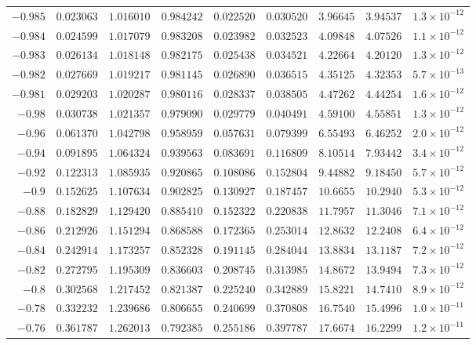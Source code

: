 \documentclass[12pt]{extarticle}
\theoremstyle{plain}
\theoremstyle{remark}
\begin{document}
{\begin{longtable}{rcccccccc}
$-0.985$ & $0.023063$ & $1.016010$ & $0.984242$ & $0.022520$ & $0.030520$ & $3.96645$ & $3.94537$ & $1.3\times10^{-12}$ \\
$-0.984$ & $0.024599$ & $1.017079$ & $0.983208$ & $0.023982$ & $0.032523$ & $4.09848$ & $4.07526$ & $1.1\times10^{-12}$ \\
$-0.983$ & $0.026134$ & $1.018148$ & $0.982175$ & $0.025438$ & $0.034521$ & $4.22664$ & $4.20120$ & $1.3\times10^{-12}$ \\
$-0.982$ & $0.027669$ & $1.019217$ & $0.981145$ & $0.026890$ & $0.036515$ & $4.35125$ & $4.32353$ & $5.7\times10^{-13}$ \\
$-0.981$ & $0.029203$ & $1.020287$ & $0.980116$ & $0.028337$ & $0.038505$ & $4.47262$ & $4.44254$ & $1.6\times10^{-12}$ \\
$-0.98$ & $0.030738$ & $1.021357$ & $0.979090$ & $0.029779$ & $0.040491$ & $4.59100$ & $4.55851$ & $1.3\times10^{-12}$ \\
$-0.96$ & $0.061370$ & $1.042798$ & $0.958959$ & $0.057631$ & $0.079399$ & $6.55493$ & $6.46252$ & $2.0\times10^{-12}$ \\
$-0.94$ & $0.091895$ & $1.064324$ & $0.939563$ & $0.083691$ & $0.116809$ & $8.10514$ & $7.93442$ & $3.4\times10^{-12}$ \\
$-0.92$ & $0.122313$ & $1.085935$ & $0.920865$ & $0.108086$ & $0.152804$ & $9.44882$ & $9.18450$ & $5.7\times10^{-12}$ \\
$-0.9$ & $0.152625$ & $1.107634$ & $0.902825$ & $0.130927$ & $0.187457$ & $10.6655$ & $10.2940$ & $5.3\times10^{-12}$ \\
$-0.88$ & $0.182829$ & $1.129420$ & $0.885410$ & $0.152322$ & $0.220838$ & $11.7957$ & $11.3046$ & $7.1\times10^{-12}$ \\
$-0.86$ & $0.212926$ & $1.151294$ & $0.868588$ & $0.172365$ & $0.253014$ & $12.8632$ & $12.2408$ & $6.4\times10^{-12}$ \\
$-0.84$ & $0.242914$ & $1.173257$ & $0.852328$ & $0.191145$ & $0.284044$ & $13.8834$ & $13.1187$ & $7.2\times10^{-12}$ \\
$-0.82$ & $0.272795$ & $1.195309$ & $0.836603$ & $0.208745$ & $0.313985$ & $14.8672$ & $13.9494$ & $7.3\times10^{-12}$ \\
$-0.8$ & $0.302568$ & $1.217452$ & $0.821387$ & $0.225240$ & $0.342889$ & $15.8221$ & $14.7410$ & $8.9\times10^{-12}$ \\
$-0.78$ & $0.332232$ & $1.239686$ & $0.806655$ & $0.240699$ & $0.370808$ & $16.7540$ & $15.4996$ & $1.0\times10^{-11}$ \\
$-0.76$ & $0.361787$ & $1.262013$ & $0.792385$ & $0.255186$ & $0.397787$ & $17.6674$ & $16.2299$ & $1.2\times10^{-11}$ \\

\end{longtable}}
\end{document}

